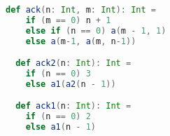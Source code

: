 \begin{lstlisting}[language=scala,caption={Definition of the \texttt{ackermann} function and its specialization.},label={lst:pps}]
  def ack(n: Int, m: Int): Int =
    if (m == 0) n + 1
    else if (n == 0) a(m - 1, 1)
    else a(m-1, a(m, n-1))

  def ack2(n: Int): Int =
    if (n == 0) 3
    else a1(a2(n - 1))

  def ack1(n: Int): Int =
    if (n == 0) 2
    else a1(n - 1)
\end{lstlisting}


